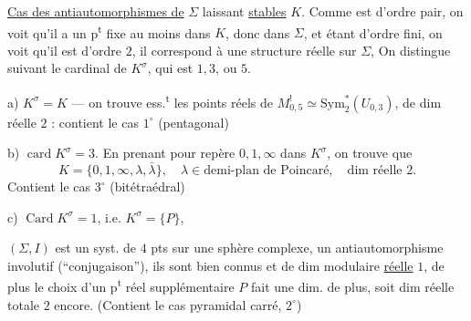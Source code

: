 {}

\uline{Cas des antiautomorphismes \inserted{\(\sigma\)} de} \(\Sigma\) laissant \uline{stables} \(K\).  Comme  est d’ordre pair, on voit qu’il  a un p\textsuperscript{t} fixe au moins dans \(K\), donc dans \(\Sigma\), et étant d’ordre fini, on voit qu’il est d’ordre \(2\), il correspond à une structure réelle sur \(\Sigma\), 
On distingue suivant le cardinal de \(K^\sigma\), qui est \(1,3\), ou \(5\).


a) \(K^\sigma=K\) --- on trouve ess.\textsuperscript{t} les points réels de
\(M_{0,5}^{!}\simeq\mathrm{Sym}_2^*(U_{0,3})\),
 de dim réelle \(2\) : contient le cas \(1^\circ\) (pentagonal)

b) \(\operatorname{card}K^\sigma=3\). En prenant pour repère \(0,1,\infty\) dans \(K^\sigma\), on trouve que
\[
K=\{0,1,\infty,\lambda,\bar\lambda\},\quad
\lambda\in\text{demi-plan de Poincaré},\quad\text{dim réelle }2.
\]
Contient le cas \(3^\circ\) (bitétraédral)

c) \(\operatorname{Card}K^\sigma=1\), i.e.  \(K^\sigma=\{P\}\),

\((\Sigma,I)\) est un syst. de \(4\) pts sur une sphère complexe,
  un antiautomorphisme
\deleted{\(\unsure{\sigma}\)} involutif (``conjugaison''), ils sont bien connus et de dim
modulaire \uline{réelle} \(1\), de plus le choix d’un p\textsuperscript{t}
réel supplémentaire \(P\) fait une dim. de
plus, soit dim réelle totale \(2\) encore.
(Contient le cas pyramidal carré, \(2^\circ\))

